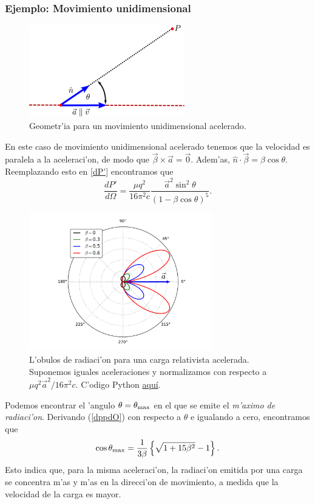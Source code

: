 \subsubsection{Ejemplo: Movimiento unidimensional}
\begin{figure}[!h]
\centerline{\includegraphics[height=4cm]{fig/fig-movimiento_lineal.pdf}}
\caption{Geometr'ia para un movimiento unidimensional acelerado.}
\label{R14}
\end{figure}
En este caso de movimiento unidimensional acelerado tenemos que la velocidad es paralela a la aceleraci'on, de modo que $\vec{\beta}\times\vec{a}=\vec{0}$. Adem'as,
$\hat{n}\cdot\vec{\beta}=\beta\cos\theta$.
Reemplazando esto en \eqref{dP'} encontramos que 
\begin{equation}
\frac{dP'}{d\Omega}=\frac{\mu q^2}{16\pi^2 c}\frac{\vec{a}^2\sin^2
\theta}{\left(1-\beta\cos\theta\right)^5}. \label{dppdO}
\end{equation}
\begin{figure}[H]
\centerline{\includegraphics[height=6cm]{fig/fig-carga-relativista.pdf}}
\caption{L'obulos de radiaci'on para una carga relativista acelerada. Suponemos
iguales aceleraciones y normalizamos con respecto a ${\mu q^2\vec{a}^2}/{16\pi^2 c}$. C'odigo Python \href{https://github.com/gfrubi/electrodinamica/blob/master/figuras-editables/fig-carga-relativista.py}{aqu\'i}.}
\label{lobulo02}
\end{figure}
Podemos encontrar el 'angulo $\theta=\theta_{\rm max}$ en el que se emite el
\textit{m'aximo de radiaci'on}. Derivando (\ref{dppdO}) con respecto a $\theta$ e
igualando a cero, encontramos que
\begin{equation}
\cos\theta_{\rm max}=\frac{1}{3\beta}\left\{  \sqrt{1+15\beta^2}-1\right\}  .
\end{equation}
Esto indica que, para la misma aceleraci'on, la radiaci'on emitida por una carga se concentra m'as y m'as en la direcci'on de movimiento, a medida que la velocidad de la carga es mayor.


